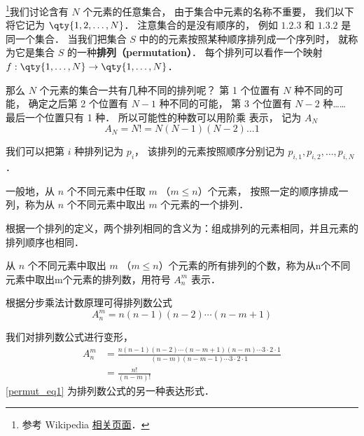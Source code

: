 


\footnote{参考 Wikipedia \href{https://en.wikipedia.org/wiki/Permutation}{相关页面}．}我们讨论含有 $N$ 个元素的任意集合， 由于集合中元素的名称不重要， 我们以下将它记为 $\qty{1,2,\dots, N}$． 注意集合的是没有顺序的， 例如 $\qty{1,2,3}$ 和 $\qty{1,3,2}$ 是同一个集合． 当我们把集合 $S$ 中的的元素按照某种顺序排列成一个序列时， 就称为它是集合 $S$ 的一种\textbf{排列（permutation）}． 每个排列可以看作一个映射 $f:\qty{1,\dots,N}\to\qty{1,\dots,N}$．

那么 $N$ 个元素的集合一共有几种不同的排列呢？ 第 1 个位置有 $N$ 种不同的可能， 确定之后第 2 个位置有 $N-1$ 种不同的可能， 第 3 个位置有 $N-2$ 种…… 最后一个位置只有 1 种． 所以可能性的种数可以用阶乘 表示， 记为 $A_N$
\begin{equation}
A_N = N! = N(N-1)(N-2)\dots 1
\end{equation}

我们可以把第 $i$ 种排列记为 $p_i$， 该排列的元素按照顺序分别记为 $p_{i,1}, p_{i,2}, \dots, p_{i,N}$．

一般地，从 $n$ 个不同元素中任取 $m$ （$m \leq n$）个元素， 按照一定的顺序排成一列，称为从 $n$ 个不同元素中取出 $m$ 个元素的一个排列．

根据一个排列的定义，两个排列相同的含义为：组成排列的元素相同，并且元素的排列顺序也相同．

从 $n$ 个不同元素中取出 $m$ （$m \leq n$）个元素的所有排列的个数，称为从n个不同元素中取出m个元素的排列数，用符号 $A_n^m$ 表示．

根据分步乘法计数原理可得排列数公式\begin{equation}
A_n^m = n (n - 1)(n - 2) \cdots (n - m + 1)
\end{equation}

我们对排列数公式进行变形，\begin{equation}\label{permut_eq1}
\begin{aligned}
A_n^m &= \frac{n(n - 1)(n - 2)\cdots	(n - m + 1)(n - m)\cdots 3\cdot 2 \cdot 1}{(n - m)(n - m -1)\cdots 3\cdot 2 \cdot 1}\\
&=\frac{n!}{(n - m)!}
\end{aligned}
\end{equation}
\autoref{permut_eq1} 为排列数公式的另一种表达形式．
